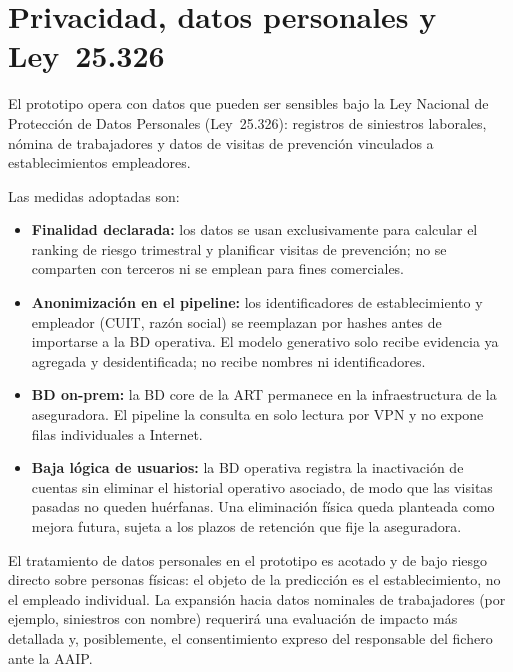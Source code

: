 
\section{Privacidad, datos personales y Ley~25.326}

El prototipo opera con datos que pueden ser sensibles bajo la Ley Nacional de Protecci\'on de Datos Personales (Ley~25.326): registros de siniestros laborales, n\'omina de trabajadores y datos de visitas de prevenci\'on vinculados a establecimientos empleadores.

Las medidas adoptadas son:
\begin{itemize}
	\item \textbf{Finalidad declarada:} los datos se usan exclusivamente para calcular el ranking de riesgo trimestral y planificar visitas de prevenci\'on; no se comparten con terceros ni se emplean para fines comerciales.
	\item \textbf{Anonimizaci\'on en el pipeline:} los identificadores de establecimiento y empleador (CUIT, raz\'on social) se reemplazan por hashes antes de importarse a la BD operativa.
	El modelo generativo solo recibe evidencia ya agregada y desidentificada; no recibe nombres ni identificadores.
	\item \textbf{BD on-prem:} la BD core de la ART permanece en la infraestructura de la aseguradora.
	El pipeline la consulta en solo lectura por VPN y no expone filas individuales a Internet.
	\item \textbf{Baja l\'ogica de usuarios:} la BD operativa registra la inactivaci\'on de cuentas sin eliminar el historial operativo asociado, de modo que las visitas pasadas no queden hu\'erfanas.
	Una eliminaci\'on f\'isica queda planteada como mejora futura, sujeta a los plazos de retenci\'on que fije la aseguradora.
\end{itemize}

El tratamiento de datos personales en el prototipo es acotado y de bajo riesgo directo sobre personas f\'isicas: el objeto de la predicci\'on es el establecimiento, no el empleado individual.
La expansi\'on hacia datos nominales de trabajadores (por ejemplo, siniestros con nombre) requerir\'a una evaluaci\'on de impacto m\'as detallada y, posiblemente, el consentimiento expreso del responsable del fichero ante la AAIP.


